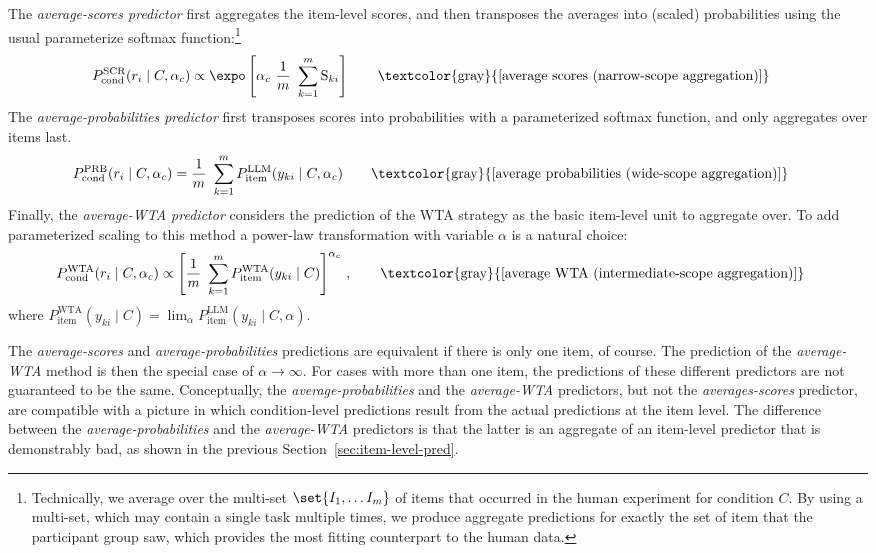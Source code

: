 \documentclass[fleqn]{article}
\begin{document}
The \emph{average-scores predictor} first aggregates the item-level scores, and then transposes the averages into (scaled) probabilities using the usual parameterize softmax function:\footnote{
  Technically, we average over the multi-set \(\set{I_1, \dots I_m}\) of items that occurred in the human experiment for condition $C$.
  By using a multi-set, which may contain a single task multiple times, we produce aggregate predictions for exactly the set of item that the participant group saw, which provides the most fitting counterpart to the human data.}
%
\begin{align*}
  & P_{\text{cond}}^{\text{SCR}}(r_{i} \mid C, \alpha_{c})
    \propto \expo \left [  \alpha_{c} \ \frac{1}{m} \ \sum_{k=1}^{m} \text{S}_{ki}  \right ]
    \tag*{\textcolor{gray}{[average scores (narrow-scope aggregation)]}}
\end{align*}
%
The \emph{average-probabilities predictor} first transposes scores into probabilities with a parameterized softmax function, and only aggregates over items last.
\begin{align*}
  & P_{\text{cond}}^{\text{PRB}}(r_{i} \mid C, \alpha_{c})
    = \frac{1}{m} \ \sum_{k=1}^{m} P_{\text{item}}^{\text{LLM}}(y_{ki} \mid C, \alpha_{c})
    \tag*{\textcolor{gray}{[average probabilities (wide-scope aggregation)]}}
\end{align*}
%
Finally, the \emph{average-WTA predictor} considers the prediction of the WTA strategy as the basic item-level unit to aggregate over.
To add parameterized scaling to this method a power-law transformation with variable $\alpha$ is a natural choice:
\begin{align*}
  & P_{\text{cond}}^{\text{WTA}}(r_{i} \mid C, \alpha_{c})
    \propto  \left [ \frac{1}{m} \ \sum_{k=1}^{m} P_{\text{item}}^{\text{WTA}}(y_{ki} \mid C) \right ]^{\alpha_{c}}\,,
    \tag*{\textcolor{gray}{[average WTA (intermediate-scope aggregation)]}}
\end{align*}
where $P_{\text{item}}^{\text{WTA}}(y_{ki} \mid C) = \lim_{\alpha} P_{\text{item}}^{\text{LLM}}(y_{ki} \mid C, \alpha)$.
\bigskip


The \emph{average-scores} and \emph{average-probabilities} predictions are equivalent if there is only one item, of course.
The prediction of the \emph{average-WTA} method is then the special case of $\alpha \rightarrow \infty$.
For cases with more than one item, the predictions of these different predictors are not guaranteed to be the same.
Conceptually, the \emph{average-probabilities} and the \emph{average-WTA} predictors, but not the \emph{averages-scores} predictor, are compatible with a picture in which condition-level predictions result from the actual predictions at the item level.
The difference between the \emph{average-probabilities} and the \emph{average-WTA} predictors is that the latter is an aggregate of an item-level predictor that is demonstrably bad, as shown in the previous Section~\ref{sec:item-level-pred}.
\end{document}
